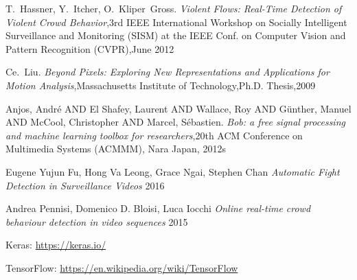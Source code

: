 \cleardoublepage
{}
{}
\begin{thebibliography}{99}

T.~Hassner, Y.~Itcher, O.~Kliper~Gross. \emph{Violent Flows: Real-Time Detection of Violent Crowd Behavior},3rd IEEE International Workshop on Socially Intelligent Surveillance and Monitoring (SISM) at the IEEE Conf. on Computer Vision and Pattern Recognition (CVPR),June 2012

Ce.~Liu. \emph{Beyond Pixels: Exploring New Representations and Applications for Motion Analysis},Massachusetts Institute of Technology,Ph.D. Thesis,2009

Anjos, Andr\'e AND El Shafey, Laurent AND Wallace, Roy AND G\"unther, Manuel AND McCool, Christopher AND Marcel, S\'ebastien. \emph{Bob: a free signal processing and machine learning toolbox for researchers},20th ACM Conference on Multimedia Systems (ACMMM), Nara Japan, 2012s

Eugene Yujun Fu, Hong Va Leong, Grace Ngai, Stephen Chan \emph{Automatic Fight Detection in Surveillance Videos} 2016

Andrea Pennisi, Domenico D. Bloisi, Luca Iocchi \emph{Online real-time crowd behaviour detection in video sequences} 2015

Keras: \url{https://keras.io/}

TensorFlow: \url{https://en.wikipedia.org/wiki/TensorFlow}




\end{thebibliography}
